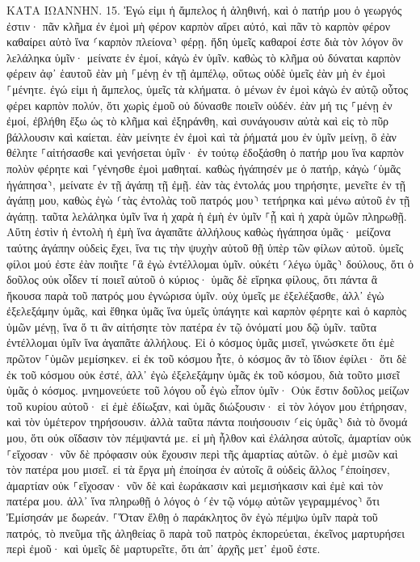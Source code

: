 \documentclass[twoside, 9pt]{extreport}
\begin{document}
ΚΑΤΑ ΙΩΑΝΝΗΝ.
15.
Ἐγώ εἰμι ἡ ἄμπελος ἡ ἀληθινή, καὶ ὁ πατήρ μου ὁ γεωργός ἐστιν· 
πᾶν κλῆμα ἐν ἐμοὶ μὴ φέρον καρπὸν αἴρει αὐτό, καὶ πᾶν τὸ καρπὸν φέρον καθαίρει αὐτὸ ἵνα ⸂καρπὸν πλείονα⸃ φέρῃ. 
ἤδη ὑμεῖς καθαροί ἐστε διὰ τὸν λόγον ὃν λελάληκα ὑμῖν· 
μείνατε ἐν ἐμοί, κἀγὼ ἐν ὑμῖν. καθὼς τὸ κλῆμα οὐ δύναται καρπὸν φέρειν ἀφ᾽ ἑαυτοῦ ἐὰν μὴ ⸀μένῃ ἐν τῇ ἀμπέλῳ, οὕτως οὐδὲ ὑμεῖς ἐὰν μὴ ἐν ἐμοὶ ⸀μένητε. 
ἐγώ εἰμι ἡ ἄμπελος, ὑμεῖς τὰ κλήματα. ὁ μένων ἐν ἐμοὶ κἀγὼ ἐν αὐτῷ οὗτος φέρει καρπὸν πολύν, ὅτι χωρὶς ἐμοῦ οὐ δύνασθε ποιεῖν οὐδέν. 
ἐὰν μή τις ⸀μένῃ ἐν ἐμοί, ἐβλήθη ἔξω ὡς τὸ κλῆμα καὶ ἐξηράνθη, καὶ συνάγουσιν αὐτὰ καὶ εἰς τὸ πῦρ βάλλουσιν καὶ καίεται. 
ἐὰν μείνητε ἐν ἐμοὶ καὶ τὰ ῥήματά μου ἐν ὑμῖν μείνῃ, ὃ ἐὰν θέλητε ⸀αἰτήσασθε καὶ γενήσεται ὑμῖν· 
ἐν τούτῳ ἐδοξάσθη ὁ πατήρ μου ἵνα καρπὸν πολὺν φέρητε καὶ ⸀γένησθε ἐμοὶ μαθηταί. 
καθὼς ἠγάπησέν με ὁ πατήρ, κἀγὼ ⸂ὑμᾶς ἠγάπησα⸃, μείνατε ἐν τῇ ἀγάπῃ τῇ ἐμῇ. 
ἐὰν τὰς ἐντολάς μου τηρήσητε, μενεῖτε ἐν τῇ ἀγάπῃ μου, καθὼς ἐγὼ ⸂τὰς ἐντολὰς τοῦ πατρός μου⸃ τετήρηκα καὶ μένω αὐτοῦ ἐν τῇ ἀγάπῃ. 
ταῦτα λελάληκα ὑμῖν ἵνα ἡ χαρὰ ἡ ἐμὴ ἐν ὑμῖν ⸀ᾖ καὶ ἡ χαρὰ ὑμῶν πληρωθῇ. 
Αὕτη ἐστὶν ἡ ἐντολὴ ἡ ἐμὴ ἵνα ἀγαπᾶτε ἀλλήλους καθὼς ἠγάπησα ὑμᾶς· 
μείζονα ταύτης ἀγάπην οὐδεὶς ἔχει, ἵνα τις τὴν ψυχὴν αὐτοῦ θῇ ὑπὲρ τῶν φίλων αὐτοῦ. 
ὑμεῖς φίλοι μού ἐστε ἐὰν ποιῆτε ⸀ἃ ἐγὼ ἐντέλλομαι ὑμῖν. 
οὐκέτι ⸂λέγω ὑμᾶς⸃ δούλους, ὅτι ὁ δοῦλος οὐκ οἶδεν τί ποιεῖ αὐτοῦ ὁ κύριος· ὑμᾶς δὲ εἴρηκα φίλους, ὅτι πάντα ἃ ἤκουσα παρὰ τοῦ πατρός μου ἐγνώρισα ὑμῖν. 
οὐχ ὑμεῖς με ἐξελέξασθε, ἀλλ᾽ ἐγὼ ἐξελεξάμην ὑμᾶς, καὶ ἔθηκα ὑμᾶς ἵνα ὑμεῖς ὑπάγητε καὶ καρπὸν φέρητε καὶ ὁ καρπὸς ὑμῶν μένῃ, ἵνα ὅ τι ἂν αἰτήσητε τὸν πατέρα ἐν τῷ ὀνόματί μου δῷ ὑμῖν. 
ταῦτα ἐντέλλομαι ὑμῖν ἵνα ἀγαπᾶτε ἀλλήλους. 
Εἰ ὁ κόσμος ὑμᾶς μισεῖ, γινώσκετε ὅτι ἐμὲ πρῶτον ⸀ὑμῶν μεμίσηκεν. 
εἰ ἐκ τοῦ κόσμου ἦτε, ὁ κόσμος ἂν τὸ ἴδιον ἐφίλει· ὅτι δὲ ἐκ τοῦ κόσμου οὐκ ἐστέ, ἀλλ᾽ ἐγὼ ἐξελεξάμην ὑμᾶς ἐκ τοῦ κόσμου, διὰ τοῦτο μισεῖ ὑμᾶς ὁ κόσμος. 
μνημονεύετε τοῦ λόγου οὗ ἐγὼ εἶπον ὑμῖν· Οὐκ ἔστιν δοῦλος μείζων τοῦ κυρίου αὐτοῦ· εἰ ἐμὲ ἐδίωξαν, καὶ ὑμᾶς διώξουσιν· εἰ τὸν λόγον μου ἐτήρησαν, καὶ τὸν ὑμέτερον τηρήσουσιν. 
ἀλλὰ ταῦτα πάντα ποιήσουσιν ⸂εἰς ὑμᾶς⸃ διὰ τὸ ὄνομά μου, ὅτι οὐκ οἴδασιν τὸν πέμψαντά με. 
εἰ μὴ ἦλθον καὶ ἐλάλησα αὐτοῖς, ἁμαρτίαν οὐκ ⸀εἴχοσαν· νῦν δὲ πρόφασιν οὐκ ἔχουσιν περὶ τῆς ἁμαρτίας αὐτῶν. 
ὁ ἐμὲ μισῶν καὶ τὸν πατέρα μου μισεῖ. 
εἰ τὰ ἔργα μὴ ἐποίησα ἐν αὐτοῖς ἃ οὐδεὶς ἄλλος ⸀ἐποίησεν, ἁμαρτίαν οὐκ ⸀εἴχοσαν· νῦν δὲ καὶ ἑωράκασιν καὶ μεμισήκασιν καὶ ἐμὲ καὶ τὸν πατέρα μου. 
ἀλλ᾽ ἵνα πληρωθῇ ὁ λόγος ὁ ⸂ἐν τῷ νόμῳ αὐτῶν γεγραμμένος⸃ ὅτι Ἐμίσησάν με δωρεάν. 
⸀Ὅταν ἔλθῃ ὁ παράκλητος ὃν ἐγὼ πέμψω ὑμῖν παρὰ τοῦ πατρός, τὸ πνεῦμα τῆς ἀληθείας ὃ παρὰ τοῦ πατρὸς ἐκπορεύεται, ἐκεῖνος μαρτυρήσει περὶ ἐμοῦ· 
καὶ ὑμεῖς δὲ μαρτυρεῖτε, ὅτι ἀπ᾽ ἀρχῆς μετ᾽ ἐμοῦ ἐστε. 
\end{document}
